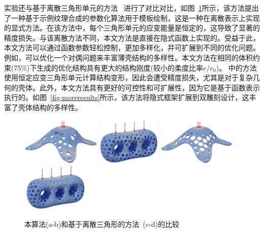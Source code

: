 实验还与基于离散三角形单元的方法~\cite{schumacher2016} 进行了对比对比，如图~\ref{fig-comparisonSGP}所示，该方法提出了一种基于示例纹理合成的参数化算法用于模板绘制，这是一种在离散表示上实现的显式方法。在该方法中，每个三角形单元的应变能量是恒定的，这导致了显著的精度损失。与该离散方法不同，本文方法是直接在隐式函数上实现的。受益于此，本文方法可以通过函数参数轻松控制，更加多样化，并可扩展到不同的优化问题。例如，可以优化一个对偶问题来丰富薄壳结构的多样性。本文方法在相同的体积约束(75\%)下生成的优化结构具有更大的结构刚度(较小的柔度比率$e/e_0$)。\citet{schumacher2016} 中的方法使用恒定应变三角形单元计算结构变形，因此会遭受精度损失，尤其是对于复杂几何的壳体。此外，本文方法具有更好的可控性和可扩展性，因为它是基于函数表示执行的。如图~\ref{fig-moreresults}所示，该方法将隐式框架扩展到双雕刻设计，这丰富了壳体结构的多样性。
\begin{figure}[htbp]
    \centering
    \includegraphics[height=0.9in]{./figures/fig-SGP_a.png}
    \hfill
    \includegraphics[height=0.9in]{./figures/fig-SGP_c.png}
    \hfill
    \includegraphics[height=0.9in]{./figures/fig-SGP_b.png}
    \hfill
    \includegraphics[height=0.9in]{./figures/fig-SGP_d.png}
    \\
    \hfill
    \hfill
    \hfill
    \hfill
    
    \caption{
        本算法(a-b)和基于离散三角形的方法~\cite{schumacher2016}(c-d)的比较}
    \label{fig-comparisonSGP}
\end{figure}
    
